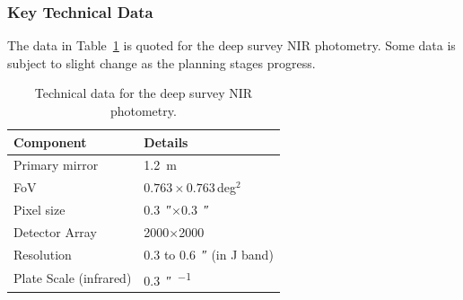 	\subsubsection{Key Technical Data} %
	\label{ssub:key_technical_data}
		The data in Table~\ref{tab:Euclid_technical} is quoted for the deep survey NIR photometry. Some data is subject to slight change as the planning stages progress.
		\begin{table}[htbp]
			\begin{center}
				\begin{tabular}{l|l}
					Component & Details \\
					\hline\hline
					Primary mirror		& \SI{1.2}{\metre} \\ \hline
					FoV 				& $0.763\times0.763$\,deg$^2$ \\ \hline
					Pixel size			& \SI{0.3}{\arcsecond}$\times$\SI{0.3}{\arcsecond} \\ \hline
					Detector Array		& \num{2000}$\times$\num{2000}\,\si{\pixel} \\ \hline
					Resolution 			& 0.3 to \SI{0.6}{\arcsecond} (in J band) \\ \hline
					Plate Scale (infrared)	& \SI{0.3}{\arcsecond\per\pixel}
				\end{tabular}
			\end{center}
			\caption{Technical data for the deep survey NIR photometry\cite{Euclid_Definition_Study_Report}.\label{tab:Euclid_technical}}
		\end{table}
